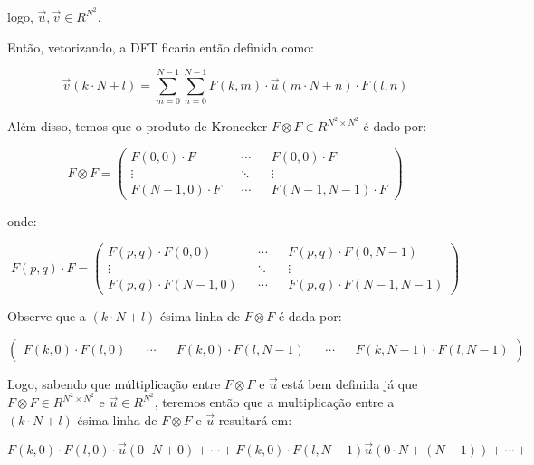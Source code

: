\documentclass[]{abntex2}
\begin{document}
logo, $\vec{u}, \vec{v} \in R^{N^2}$.

Então, vetorizando, a DFT ficaria então definida como:

\begin{equation*}
	\vec{v}(k\cdot N + l) = \sum_{m=0}^{N-1} \sum_{n=0}^{N-1} F(k,m) \cdot \vec{u}(m\cdot N + n) \cdot F(l,n)
\end{equation*}

Além disso, temos que o produto de Kronecker $F \otimes F \in R^{N^2 \times N^2}$ é dado por:

\begin{equation*}
	F \otimes F = \begin{pmatrix}
		F(0,0)\cdot F && \cdots && F(0,0)\cdot F \\
		\vdots && \ddots && \vdots  \\
		F(N-1,0)\cdot F && \cdots && F(N-1,N-1)\cdot F
		\end{pmatrix}
\end{equation*}

onde:

\begin{equation*}
	F(p,q) \cdot F = \begin{pmatrix}
		F(p,q)\cdot F(0, 0) && \cdots && F(p,q)\cdot F(0, N-1) \\
		\vdots && \ddots && \vdots  \\
		F(p,q)\cdot F(N-1,0) && \cdots && F(p,q)\cdot F(N-1,N-1)
		\end{pmatrix}
\end{equation*}

Observe que a $(k\cdot N+l)$-ésima linha de $F \otimes F$ é dada por:

\begin{equation*}
	\begin{pmatrix}
		F(k,0)\cdot F(l,0) && \cdots && F(k,0)\cdot F(l,N-1) && \cdots && F(k,N-1)\cdot F(l,N-1)
		\end{pmatrix}
\end{equation*}

Logo, sabendo que múltiplicação entre $F \otimes F$ e $\vec{u}$ está bem definida já que $F \otimes F\in R^{N^2\times N^2}$ e $\vec{u}\in R^{N^2}$, teremos então que a multiplicação entre a $(k\cdot N+l)$-ésima linha de $F \otimes F$ e $\vec{u}$ resultará em:

\begin{equation*}
	F(k,0)\cdot F(l,0) \cdot \vec{u}(0\cdot N + 0) + \cdots +  F(k,0)\cdot F(l,N-1) \vec{u}(0\cdot N + (N-1)) + \cdots + 
\end{equation*}
\end{document}
